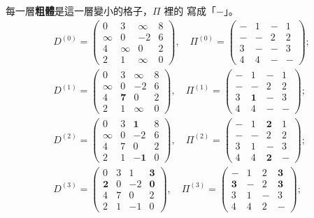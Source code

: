 每一層\textbf{粗體}是這一層變小的格子，$\Pi$ 裡的 \NIL 寫成「$-$」。
\begin{gather*}
D^{(0)} = \begin{pmatrix} 0 & 3 & \infty & 8 \\ \infty & 0 & -2 & 6 \\ 4 & \infty & 0 & 2 \\ 2 & 1 & \infty & 0 \end{pmatrix},\quad
\Pi^{(0)} = \begin{pmatrix} - & 1 & - & 1 \\ - & - & 2 & 2 \\ 3 & - & - & 3 \\ 4 & 4 & - & - \end{pmatrix}; \\
D^{(1)} = \begin{pmatrix} 0 & 3 & \infty & 8 \\ \infty & 0 & -2 & 6 \\ 4 & \mathbf{7} & 0 & 2 \\ 2 & 1 & \infty & 0 \end{pmatrix},\quad
\Pi^{(1)} = \begin{pmatrix} - & 1 & - & 1 \\ - & - & 2 & 2 \\ 3 & \mathbf{1} & - & 3 \\ 4 & 4 & - & - \end{pmatrix}; \\
D^{(2)} = \begin{pmatrix} 0 & 3 & \mathbf{1} & 8 \\ \infty & 0 & -2 & 6 \\ 4 & 7 & 0 & 2 \\ 2 & 1 & \mathbf{-1} & 0 \end{pmatrix},\quad
\Pi^{(2)} = \begin{pmatrix} - & 1 & \mathbf{2} & 1 \\ - & - & 2 & 2 \\ 3 & 1 & - & 3 \\ 4 & 4 & \mathbf{2} & - \end{pmatrix}; \\
D^{(3)} = \begin{pmatrix} 0 & 3 & 1 & \mathbf{3} \\ \mathbf{2} & 0 & -2 & \mathbf{0} \\ 4 & 7 & 0 & 2 \\ 2 & 1 & -1 & 0 \end{pmatrix},\quad
\Pi^{(3)} = \begin{pmatrix} - & 1 & 2 & \mathbf{3} \\ \mathbf{3} & - & 2 & \mathbf{3} \\ 3 & 1 & - & 3 \\ 4 & 4 & 2 & - \end{pmatrix}; \\

\end{gather*}
